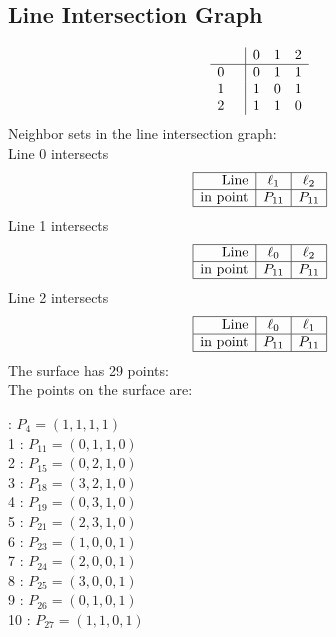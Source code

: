 \documentclass{article}
\begin{document}
{\subsection*{Line Intersection Graph}
{\arraycolsep=1pt
$$
\begin{array}{rr|*{3}r}
 &  & 0 & 1 & 2\\
\hline
0 &  & 0 & 1 & 1\\
1 &  & 1 & 0 & 1\\
2 &  & 1 & 1 & 0\\
\end{array}
$$
}%
Neighbor sets in the line intersection graph:\\
Line 0 intersects 
$$
\begin{array}{|r*{2}{|c}|}
\hline
\mbox{Line}  & \ell_{1} & \ell_{2}\\
\hline
\mbox{in point}  & P_{11} & P_{11}\\
\hline
\end{array}
$$
Line 1 intersects 
$$
\begin{array}{|r*{2}{|c}|}
\hline
\mbox{Line}  & \ell_{0} & \ell_{2}\\
\hline
\mbox{in point}  & P_{11} & P_{11}\\
\hline
\end{array}
$$
Line 2 intersects 
$$
\begin{array}{|r*{2}{|c}|}
\hline
\mbox{Line}  & \ell_{0} & \ell_{1}\\
\hline
\mbox{in point}  & P_{11} & P_{11}\\
\hline
\end{array}
$$
The surface has 29 points:\\
The points on the surface are:\\
\begin{multicols}{3}
 : $P_{4}=( 1, 1, 1, 1 )$\\
1 : $P_{11}=( 0, 1, 1, 0 )$\\
2 : $P_{15}=( 0, 2, 1, 0 )$\\
3 : $P_{18}=( 3, 2, 1, 0 )$\\
4 : $P_{19}=( 0, 3, 1, 0 )$\\
5 : $P_{21}=( 2, 3, 1, 0 )$\\
6 : $P_{23}=( 1, 0, 0, 1 )$\\
7 : $P_{24}=( 2, 0, 0, 1 )$\\
8 : $P_{25}=( 3, 0, 0, 1 )$\\
9 : $P_{26}=( 0, 1, 0, 1 )$\\
10 : $P_{27}=( 1, 1, 0, 1 )$\\

\end{multicols}}
\end{document}
